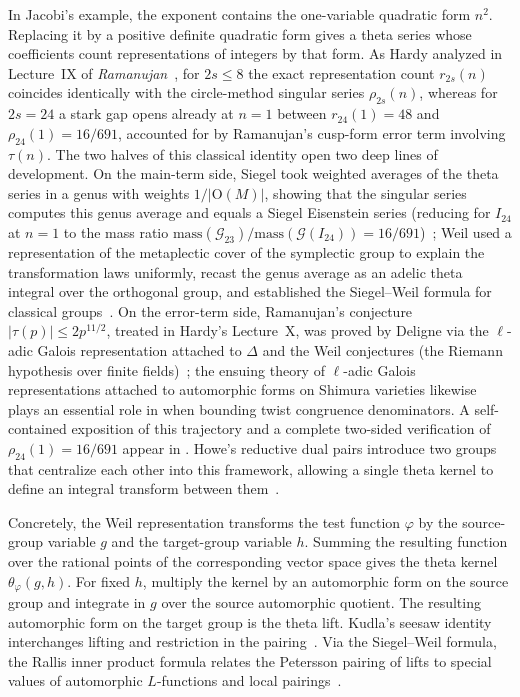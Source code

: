 In Jacobi's example, the exponent contains the one-variable quadratic form $n^2$. Replacing it by a positive definite quadratic form gives a theta series whose coefficients count representations of integers by that form. As Hardy analyzed in Lecture~IX of \emph{Ramanujan}~\cite{Hardy1940}, for $2s\le 8$ the exact representation count $r_{2s}(n)$ coincides identically with the circle-method singular series $\rho_{2s}(n)$, whereas for $2s=24$ a stark gap opens already at $n=1$ between $r_{24}(1)=48$ and $\rho_{24}(1)=16/691$, accounted for by Ramanujan's cusp-form error term involving $\tau(n)$. The two halves of this classical identity open two deep lines of development. On the main-term side, Siegel took weighted averages of the theta series in a genus with weights $1/|\mathrm O(M)|$, showing that the singular series computes this genus average and equals a Siegel Eisenstein series (reducing for $I_{24}$ at $n=1$ to the mass ratio $\mathrm{mass}(\mathcal G_{23})/\mathrm{mass}(\mathcal G(I_{24}))=16/691$)~\cite{Siegel1935,ConwaySloane1988,Li2023}; Weil used a representation of the metaplectic cover of the symplectic group to explain the transformation laws uniformly, recast the genus average as an adelic theta integral over the orthogonal group, and established the Siegel--Weil formula for classical groups~\cite{Weil1964,Weil1965,Weil1982}. On the error-term side, Ramanujan's conjecture $|\tau(p)|\le 2p^{11/2}$, treated in Hardy's Lecture~X, was proved by Deligne via the $\ell$-adic Galois representation attached to $\Delta$ and the Weil conjectures (the Riemann hypothesis over finite fields)~\cite{Deligne1971,Deligne1974}; the ensuing theory of $\ell$-adic Galois representations attached to automorphic forms on Shimura varieties likewise plays an essential role in  when bounding twist congruence denominators. A self-contained exposition of this trajectory and a complete two-sided verification of $\rho_{24}(1)=16/691$ appear in . Howe's reductive dual pairs introduce two groups that centralize each other into this framework, allowing a single theta kernel to define an integral transform between them~\cite{Howe1979,Howe1989}.

Concretely, the Weil representation transforms the test function $\varphi$ by the source-group variable $g$ and the target-group variable $h$. Summing the resulting function over the rational points of the corresponding vector space gives the theta kernel $\theta_\varphi(g,h)$. For fixed $h$, multiply the kernel by an automorphic form on the source group and integrate in $g$ over the source automorphic quotient. The resulting automorphic form on the target group is the theta lift. Kudla's seesaw identity interchanges lifting and restriction in the pairing~\cite{Kudla1984}. Via the Siegel--Weil formula, the Rallis inner product formula relates the Petersson pairing of lifts to special values of automorphic $L$-functions and local pairings~\cite{Li1992,KudlaRallis1994,GQT2014}.

